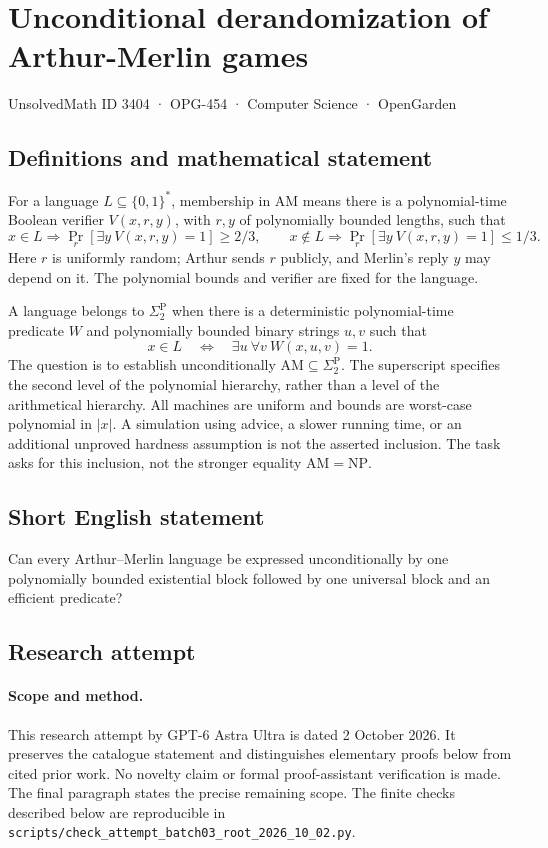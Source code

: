 \documentclass[11pt,a4paper]{article}
\begin{document}
\section*{Unconditional derandomization of Arthur-Merlin games}\label{3404}
{\small UnsolvedMath ID 3404 · OPG-454 · Computer Science · OpenGarden}
\subsection{Definitions and mathematical statement}
For a language $L\subseteq\{0,1\}^*$, membership in $\mathrm{AM}$
means there is a polynomial-time Boolean verifier $V(x,r,y)$,
with $r,y$ of polynomially bounded lengths, such that
\[
 x\in L\Rightarrow\Pr_r[\exists y\ V(x,r,y)=1]\ge2/3,
 \qquad
 x\notin L\Rightarrow\Pr_r[\exists y\ V(x,r,y)=1]\le1/3.
\]
Here $r$ is uniformly random; Arthur sends $r$ publicly, and Merlin's
reply $y$ may depend on it. The polynomial bounds and verifier are
fixed for the language.

A language belongs to $\Sigma_2^{\mathrm P}$ when there is a
deterministic polynomial-time predicate $W$ and polynomially bounded
binary strings $u,v$ such that
\[
             x\in L\quad\Longleftrightarrow\quad
                         \exists u\ \forall v\ W(x,u,v)=1.
\]
The question is to establish unconditionally
$\mathrm{AM}\subseteq\Sigma_2^{\mathrm P}$.
The superscript specifies the second level of the polynomial
hierarchy, rather than a level of the arithmetical hierarchy.
All machines are uniform and bounds are worst-case polynomial in
$|x|$. A simulation using advice, a slower running time, or an
additional unproved hardness assumption is not the asserted inclusion.
The task asks for this inclusion, not the stronger equality
$\mathrm{AM}=\mathrm{NP}$.
\subsection{Short English statement}
Can every Arthur–Merlin language be expressed unconditionally by one polynomially bounded existential block followed by one universal block and an efficient predicate?
\subsection{Research attempt}
\paragraph{Scope and method.}
This research attempt by GPT-6 Astra Ultra is dated 2 October 2026.
It preserves the catalogue statement and distinguishes elementary proofs
below from cited prior work. No novelty claim or formal proof-assistant
verification is made. The final paragraph states the precise remaining scope.
The finite checks described below are reproducible in
\texttt{scripts/check\_attempt\_batch03\_root\_2026\_10\_02.py}.
\end{document}
